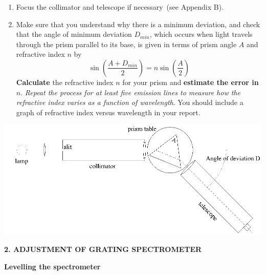 \documentclass[12pt]{article}
\begin{document}
\begin{enumerate}
\item Focus the collimator and telescope if necessary~(see Appendix B).

\item Make sure that you understand why there is a minimum deviation, and check that the angle of minimum deviation $D_{min}$, which occurs when light travels through the prism parallel to its base, is given in terms of prism angle $A$ and refractive index $n$ by \[  \sin \left( \frac{A+D_{min}}{2} \right) = n \sin \left( \frac{A}{2} \right)   \] {\bf Calculate} the refractive index $n$ for your prism and {\bf estimate the error in $n$}. {\sl Repeat the process for at least five emission lines to measure how the refractive index varies as a function of wavelength}. You should include a graph of refractive index versus wavelength in your report.
\end{enumerate}

\begin{center}
\includegraphics{ap3labspec1.ps}
\end{center}

\newpage

{\bf 2. ADJUSTMENT OF GRATING SPECTROMETER}

{\bf Levelling the spectrometer}
\end{document}
